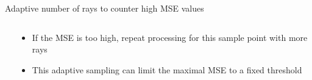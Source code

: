\begin{frame}[t]{Adaptive number of rays to counter high MSE values}
\begin{columns}[T]
\begin{column}{.5\textwidth}
    \end{column}
    \begin{column}{.5\textwidth}
      \begin{itemize}
        \item If the MSE is too high, repeat processing for this sample point with more rays
        \item This adaptive sampling can limit the maximal MSE to a fixed threshold
      \end{itemize}
    \end{column}
  \end{columns}
\end{frame}

